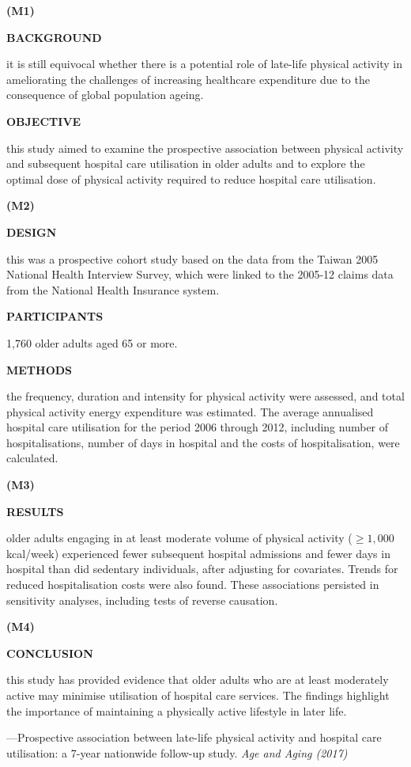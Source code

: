 \documentclass[a4paper]{ctexbook}
\begin{document}
\begin{sample}[label={myautocounter}]{\heiti}

\textbf{(M1)}

\textbf{BACKGROUND }

it is still equivocal whether there is a potential role of late-life physical activity in ameliorating the challenges of increasing healthcare expenditure due to the consequence of global population ageing.

\textbf{OBJECTIVE} 

this study aimed to examine the prospective association between physical activity and subsequent hospital care utilisation in older adults and to explore the optimal dose of physical activity required to reduce hospital care utilisation.

\textbf{(M2)}

\textbf{DESIGN} 

this was a prospective cohort study based on the data from the Taiwan 2005 National Health Interview Survey, which were linked to the 2005-12 claims data from the National Health Insurance system.

\textbf{PARTICIPANTS}

1,760 older adults aged 65 or more.

\textbf{METHODS} 

the frequency, duration and intensity for physical activity were assessed, and total physical activity energy expenditure was estimated. The average annualised hospital care utilisation for the period 2006 through 2012, including number of hospitalisations, number of days in hospital and the costs of hospitalisation, were calculated.

\textbf{(M3)}

\textbf{RESULTS }

older adults engaging in at least moderate volume of physical activity ($\geqslant 1,000$ kcal/week) experienced fewer subsequent hospital admissions and fewer days in hospital than did sedentary individuals, after adjusting for covariates. Trends for reduced hospitalisation costs were also found. These associations persisted in sensitivity analyses, including tests of reverse causation.

\textbf{(M4)}

\textbf{CONCLUSION}

this study has provided evidence that older adults who are at least moderately active may minimise utilisation of hospital care services. The findings highlight the importance of maintaining a physically active lifestyle in later life.

\begin{flushright}
  ---Prospective association between late-life physical activity and hospital care utilisation: a 7-year nationwide follow-up study. \emph{Age and Aging (2017)}
\end{flushright}

\end{sample}
\end{document}
